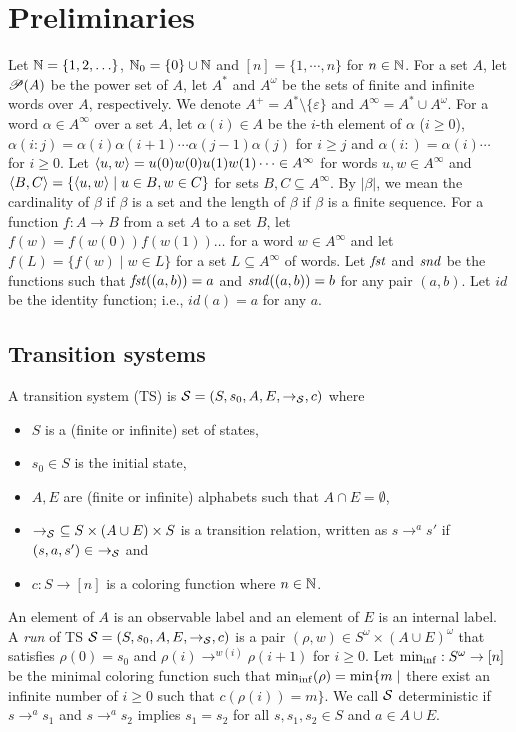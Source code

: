 \section{Preliminaries}
Let $\mathbb{N}=\{1,2,\ldots\}$, $\mathbb{N}_0=\{0\} \cup \mathbb{N}$ and $[n]=\{1,\cdots,n\}$ for $n\in\mathbb{N}$.
For a set $A$, let $\mathscr{P}(A)$ be the power set of $A$,
let $A^*$ and $A^\omega$ be the sets of finite and infinite words over $A$, respectively.
We denote $A^+ = A^*\setminus\{\varepsilon\}$ and
$A^\infty = A^* \cup A^\omega$.
For a word $\alpha\in A^\infty$ over a set $A$,
let $\alpha(i)\in A$ be the $i$-th element of $\alpha$ ($i\geq 0$),
$\alpha(i:j)=\alpha(i)\alpha(i+1)\cdots\alpha(j-1)\alpha(j)$ for $i\geq j$
and $\alpha(i:)=\alpha(i)\cdots$ for $i\geq 0$.
Let $\langle u, w\rangle = u(0)w(0)u(1)w(1)\cdots \in A^\infty$ for words $u,w\in A^\infty$ and $\langle B, C\rangle = \{\langle u, w\rangle\mid u\in B, w\in C\}$ for sets $B, C\subseteq A^\infty$.
By $|\beta|$, we mean the cardinality of $\beta$ if $\beta$ is a set
and the length of $\beta$ if $\beta$ is a finite sequence.
For a function $f:A\to B$ from a set $A$ to a set $B$,
let $f(w)=f(w(0))f(w(1))\ldots$ for a word $w\in A^{\infty}$
and let $f(L)=\{f(w)\mid w\in L\}$ for a set $L\subseteq A^{\infty}$
of words.
Let $\mathit{fst}$ and $\mathit{snd}$ be the functions such that $\mathit{fst}((a,b))=a$ and $\mathit{snd}((a,b))=b$ for any pair $(a,b)$.
Let $\mathit{id}$ be the identity function; i.e.,
$\mathit{id}(a)=a$ for any $a$.

\subsection{Transition systems}
\begin{definition}
A {transition system} (TS)
is ${\cal S}=(S, s_0, A, E, \to_{\cal S}, c)$ where
\begin{itemize}
\item $S$ is a (finite or infinite) set of states,
\item $s_0\in S$ is the initial state,
\item $A, E$ are (finite or infinite) alphabets such that $A\cap E = \emptyset$,
\item $\to_{\cal S}\ \subseteq S\times(A\cup E)\times S$ is a transition relation, written as $s\to^a s'$ if $(s,a,s')\in\ \to_{\cal S}$ and
\item $c: S \to [n]$ is a coloring function where $n\in \mathbb{N}$.
\end{itemize}
\end{definition}
An element of $A$ is an observable label and an element of $E$ is an internal label.
A \emph{run} of TS ${\cal S}=(S, s_0, A, E, \to_{\cal S}, c)$ is
a pair $(\rho, w)\in S^\omega \times (A\cup E)^\omega$ that satisfies
$\rho(0)=s_0$ and $\rho(i)\to^{w(i)}\rho(i+1)$ for $i\geq 0$.
Let ${\rm min_{inf}}: S^\omega \to [n]$ be the minimal coloring function such that
${\rm min_{inf}}(\rho)={\rm min}\{m\mid$ there exist an infinite number of $i\geq 0$ such that $c(\rho(i)) = m\}$.
We call ${\cal S}$ deterministic if $s\to^a s_1$ and $s\to^a s_2$ implies $s_1=s_2$ for all $s,s_1,s_2\in S$ and $a\in A\cup E$.

